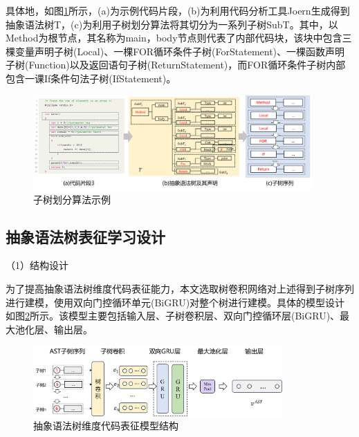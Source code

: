 具体地，如图\ref{fig:astshili}所示，(a)为示例代码片段，(b)为利用代码分析工具Joern生成得到抽象语法树T，(c)为利用子树划分算法将其切分为一系列子树SubT。其中，以Method为根节点，其名称为main，body节点则代表了内部代码块，该块中包含三棵变量声明子树(Local)、一棵FOR循环条件子树(ForStatement)、一棵函数声明子树(Function)以及返回语句子树(ReturnStatement)，而FOR循环条件子树内部包含一课If条件句法子树(IfStatement)。

\begin{figure}[H]
  \centering
  \includegraphics[width=0.95\textwidth]{figures/astshili.png}
  \caption{子树划分算法示例}\label{fig:astshili}
\end{figure}

    

\subsection{抽象语法树表征学习设计}
\label{subsec:ASTModel}
（1）结构设计

为了提高抽象语法树维度代码表征能力，本文选取树卷积网络对上述得到子树序列进行建模，使用双向门控循环单元(BiGRU)对整个树进行建模。具体的模型设计如图\ref{fig:astmodel}所示。该模型主要包括输入层、子树卷积层、双向门控循环层(BiGRU)、最大池化层、输出层。
\begin{figure}[H]
  \centering
  \includegraphics[width=0.85\textwidth]{figures/astmodel.png}
  \caption{抽象语法树维度代码表征模型结构}\label{fig:astmodel}
\end{figure}

